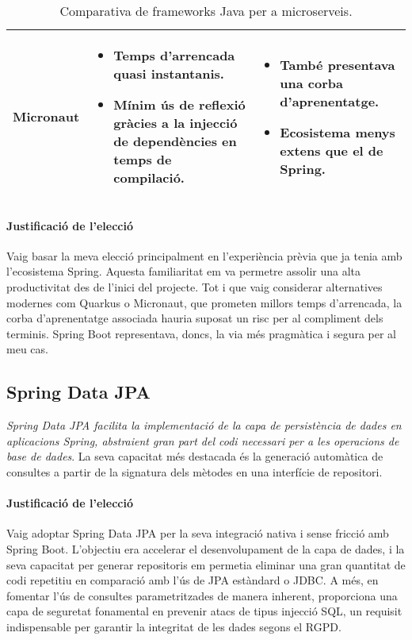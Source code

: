 \begin{table}[h]
\begin{tabular}{|l|p{5cm}|p{5cm}|}
\hline
\textbf{Micronaut} & 
\begin{itemize}
    \item Temps d'arrencada quasi instantanis.
    \item Mínim ús de reflexió gràcies a la injecció de dependències en temps de compilació.
\end{itemize} & 
\begin{itemize}
    \item També presentava una corba d'aprenentatge.
    \item Ecosistema menys extens que el de Spring.
\end{itemize} \\
\hline
\end{tabular}
\caption{Comparativa de frameworks Java per a microserveis.}
\label{tab:frameworks_backend}
\end{table}

\paragraph{Justificació de l'elecció}
Vaig basar la meva elecció principalment en l'experiència prèvia que ja tenia amb l'ecosistema Spring. Aquesta familiaritat em va permetre assolir una alta productivitat des de l'inici del projecte. Tot i que vaig considerar alternatives modernes com Quarkus o Micronaut, que prometen millors temps d'arrencada, la corba d'aprenentatge associada hauria suposat un risc per al compliment dels terminis. Spring Boot representava, doncs, la via més pragmàtica i segura per al meu cas.

\subsection{Spring Data JPA}
\textit{Spring Data JPA facilita la implementació de la capa de persistència de dades en aplicacions Spring, abstraient gran part del codi necessari per a les operacions de base de dades}. La seva capacitat més destacada és la generació automàtica de consultes a partir de la signatura dels mètodes en una interfície de repositori.

\paragraph{Justificació de l'elecció}
Vaig adoptar Spring Data JPA per la seva integració nativa i sense fricció amb Spring Boot. L'objectiu era accelerar el desenvolupament de la capa de dades, i la seva capacitat per generar repositoris em permetia eliminar una gran quantitat de codi repetitiu en comparació amb l'ús de JPA estàndard o JDBC. A més, en fomentar l'ús de consultes parametritzades de manera inherent, proporciona una capa de seguretat fonamental en prevenir atacs de tipus injecció SQL, un requisit indispensable per garantir la integritat de les dades segons el RGPD.

